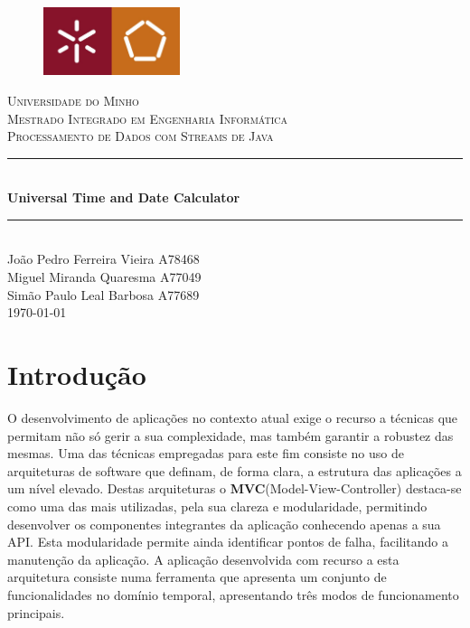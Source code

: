 \documentclass{article}
\newcommand{\titleRule}{
    \rule{\linewidth}{0.5mm} \\ [0.25cm]
}
\begin{document}
\begin{titlepage}
    \center
    \begin{figure}[H]
        \centering
        \includegraphics[width=4cm]{UM_EENG.jpg}
    \end{figure}
    \textsc{\LARGE Universidade do Minho} \\ [1.5cm]
    \textsc{\Large Mestrado Integrado em Engenharia Informática} \\ [0.5cm]
    \textsc{\large Processamento de Dados com Streams de Java} \\ [0.5cm]

    \titleRule
    {\huge \bfseries Universal Time and Date Calculator}
    \titleRule
    
    João Pedro Ferreira Vieira A78468 \\
    Miguel Miranda Quaresma A77049 \\
    Simão Paulo Leal Barbosa A77689 \\[0.25cm]

    \today
\end{titlepage}

\newpage

\tableofcontents

\newpage

\section{Introdução}
O desenvolvimento de aplicações no contexto atual exige o recurso a técnicas que permitam não só gerir a sua complexidade, mas também garantir a robustez das mesmas.
\newline
Uma das técnicas empregadas para este fim consiste no uso de arquiteturas de software que definam, de forma clara, a estrutura das aplicações a um nível elevado.
\newline
Destas arquiteturas o \textbf{MVC}(Model-View-Controller) destaca-se como uma das mais utilizadas, pela sua clareza e modularidade, permitindo desenvolver os componentes integrantes da aplicação conhecendo apenas a sua API. Esta modularidade permite ainda identificar pontos de falha, facilitando a manutenção da aplicação.
\newline
A aplicação desenvolvida com recurso a esta arquitetura consiste numa ferramenta que apresenta um conjunto de funcionalidades no domínio temporal, apresentando três modos de funcionamento principais.
\end{document}
